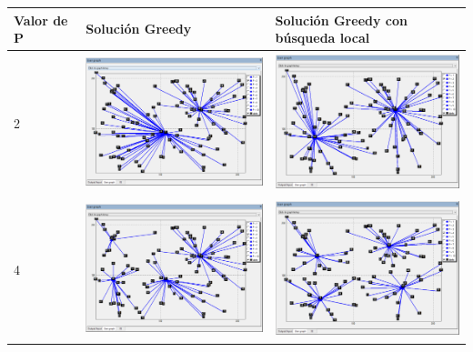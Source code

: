 \documentclass[a4paper,11pt]{article}
\begin{document}
\begin{table}[!htbp]
\label{images_100}
\centering
\begin{tabularx}{\textwidth}{|p{1cm}|X|X|}
\hline
Valor de P	& Solución Greedy	& Solución Greedy con búsqueda local	\\ \hline
2 & \includegraphics[width=6.5cm, height=4cm]{images/greedy_100_p2.png}	& \includegraphics[width=6.5cm, height=4cm]{images/greedy_busqueda_local_100_p2.png}	\\ \hline
4 & \includegraphics[width=6.5cm, height=4cm]{images/greedy_100_p4.png}	& \includegraphics[width=6.5cm, height=4cm]{images/greedy_busqueda_local_100_p4.png}	\\ \hline

\end{tabularx}
\end{table}
\end{document}
